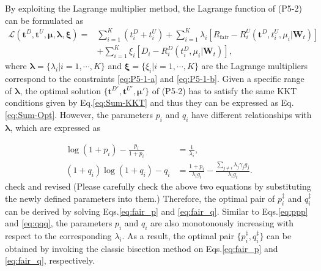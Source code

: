 \documentclass[12pt,draft,onecolumn,journal]{IEEEtran}
\begin{document}
By exploiting the Lagrange multiplier method, the Lagrange function of (P5-2) can be formulated as
\begin{align}
	\mathcal{L}(\mathbf{t}^D,\mathbf{t}^U,\boldsymbol{\mu},\boldsymbol{\lambda},\boldsymbol{\xi}) = &\sum_{i=1}^{K}{(t_i^D+t_i^U)} +\sum_{i=1}^{K}{\lambda_{i}[R_{\text{fair}}-R_i^U(\mathbf{t}^D,t_i^U,\mu_i | \mathbf{W}_t)]} \nonumber \\
& +\sum_{i=1}^{K}\xi_i[D_i-R_i^D(t_i^D,\mu_i | \mathbf{W}_t)],
\end{align}
where $\boldsymbol{\lambda} = \{\lambda_i | i=1,\cdots,K\}$ and $\boldsymbol{\xi} = \{\xi_i | i = 1,\cdots,K\}$ are the Lagrange multipliers correspond to the constraints \eqref{eq:P5-1-a} and \eqref{eq:P5-1-b}. Given a specific range of $\boldsymbol{\lambda}$, the optimal solution $\{\mathbf{t}^{D'}, \mathbf{t}^{U'}, \boldsymbol{\mu}'\}$ of (P5-2) has to satisfy the same KKT conditions given by Eq.\eqref{eq:Sum-KKT} and thus they can be expressed as Eq.\eqref{eq:Sum-Opt}. However, the parameters $p_i$ and $q_i$ have different relationships with $\boldsymbol{\lambda}$, which are expressed as

\begin{align}
	 \log(1+p_i)-\frac{p_i}{1+p_i}&=\frac{1}{\lambda_i}, \label{eq:fair_p}\\ 
 (1+q_i)\log(1+q_i)-q_i&=\frac{1+p_i}{\lambda_i g_i}-\frac{\sum_{j \neq i}\lambda_j\gamma_jg_j}{\lambda_ig_i}. \label{eq:fair_q}
\end{align}
\cbstart check and revised \cbend
{\color{red}(Please carefully check the above two equations by substituting the newly defined parameters into them.)} Therefore, the optimal pair of $p_i^{\ddagger}$ and $q_i^{\ddagger}$ can be derived by solving Eqs.\ref{eq:fair_p} and \eqref{eq:fair_q}. Similar to Eqs.\eqref{eq:ppp} and \eqref{eq:qqq}, the parameters $p_i$ and $q_i$ are also monotonously increasing with respect to the corresponding $\lambda_i$. As a result, the optimal pair $\{p_i^{\ddagger},q_i^{\ddagger}\}$ can be obtained by invoking the classic bisection method on Eqs.\ref{eq:fair_p} and \eqref{eq:fair_q}, respectively. 
\end{document}
